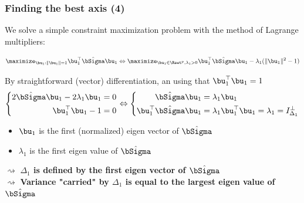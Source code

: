 \documentclass{beamer}\usepackage[]{graphicx}\usepackage[]{color}
\begin{document}
\begin{frame}
  \frametitle{Finding the best axis (4)}

  We solve a simple constraint maximization problem with the method of Lagrange multipliers:
  
  \begin{equation*}
    \maximize_{\bu_1: \|\bu_1\| = 1 } \bu_1^\top \hat\bSigma \bu_1 \Leftrightarrow \maximize_{\bu_1\in\Rset^p, \lambda_1 > 0} \bu_1^\top \hat\bSigma \bu_1 - \lambda_1 (\|\bu_1\|^2 - 1)
  \end{equation*}
  
  By straightforward (vector) differentiation, an using that $\bu_1^\top \bu_1 = 1$
  \begin{equation*}
    \left\{\begin{aligned}
      2\hat\bSigma \bu_1 - 2\lambda_1 \bu_1 & = 0 \\  
      \bu_1^\top \bu_1 - 1 & = 0 \\  
    \end{aligned}\right. \Leftrightarrow
    \left\{\begin{aligned}
      \hat\bSigma \bu_1 & = \lambda_1 \bu_1  \\  
      \bu_1^\top \hat\bSigma \bu_1 & = \lambda_1 \bu_1^\top \bu_1 = \lambda_1 = I_{\Delta_1}^\bot \\  
    \end{aligned}\right.
  \end{equation*}
  
  \begin{itemize} 
     \item $\bu_1$ is the first (normalized) eigen vector of $\hat{\bSigma}$
     \item $\lambda_1$ is the first eigen value of $\hat{\bSigma}$
   \end{itemize} 
  
  $\rightsquigarrow$ \alert{\bf $\Delta_1$ is defined by the first eigen vector of $\hat\bSigma$}\\
  $\rightsquigarrow$ \alert{\bf Variance "carried" by $\Delta_1$ is equal to the largest eigen value of $\hat\bSigma$}
  
\end{frame}
\end{document}
